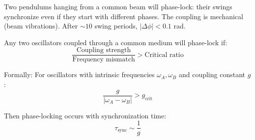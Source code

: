 \begin{example}
Two pendulums hanging from a common beam will phase-lock: their swings synchronize even if they start with different phases. The coupling is mechanical (beam vibrations). After $\sim 10$ swing periods, $|\Delta\phi| < 0.1$ rad.
\end{example}

\begin{theorem}
\label{thm:universal_phase_lock}
Any two oscillators coupled through a common medium will phase-lock if:
\begin{equation}
\frac{\text{Coupling strength}}{\text{Frequency mismatch}} > \text{Critical ratio}
\end{equation}

Formally: For oscillators with intrinsic frequencies $\omega_A, \omega_B$ and coupling constant $g$:
\begin{equation}
\frac{g}{|\omega_A - \omega_B|} > g_{\text{crit}}
\end{equation}

Then phase-locking occurs with synchronization time:
\begin{equation}
\tau_{\text{sync}} \sim \frac{1}{g}
\end{equation}
\end{theorem}

